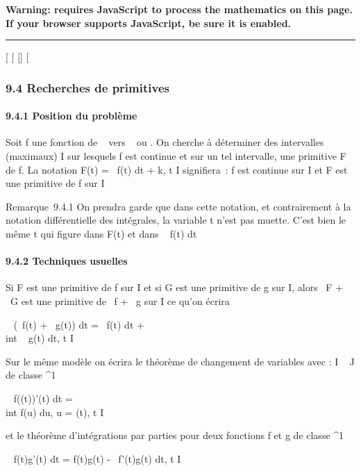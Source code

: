 \textbf{Warning: 
requires JavaScript to process the mathematics on this page.\\ If your
browser supports JavaScript, be sure it is enabled.}

\begin{center}\rule{3in}{0.4pt}\end{center}

{[}
{[}
{[}{]}
{[}

\subsubsection{9.4 Recherches de primitives}

\paragraph{9.4.1 Position du problème}

Soit f une fonction de ~ vers ~ ou . On cherche à déterminer des
intervalles (maximaux) I sur lesquels f est continue et sur un tel
intervalle, une primitive F de f. La notation F(t)
=\int ~ f(t) dt + k, t \in I signifiera~: f est
continue sur I et F est une primitive de f sur I

Remarque~9.4.1 On prendra garde que dans cette notation, et
contrairement à la notation différentielle des intégrales, la variable t
n'est pas muette. C'est bien le même t qui figure dans F(t) et dans
\int ~ f(t) dt

\paragraph{9.4.2 Techniques usuelles}

Si F est une primitive de f sur I et si G est une primitive de g sur I,
alors \alpha~F + \beta~G est une primitive de \alpha~f + \beta~g sur I ce qu'on écrira

\int ~ (\alpha~f(t) + \beta~g(t)) dt =
\alpha~\int  f(t) dt + \beta~\\int ~
g(t) dt, t \in I

Sur le même modèle on écrira le théorème de changement de variables avec
\phi : I \rightarrow~ J de classe ^1

\int ~ f(\phi(t))\phi'(t) dt =\\int
 f(u) du, u = \phi(t), t \in I

et le théorème d'intégrations par parties pour deux fonctions f et g de
classe ^1

\int ~ f(t)g'(t) dt = f(t)g(t)
-\int ~ f'(t)g(t) dt, t \in I

